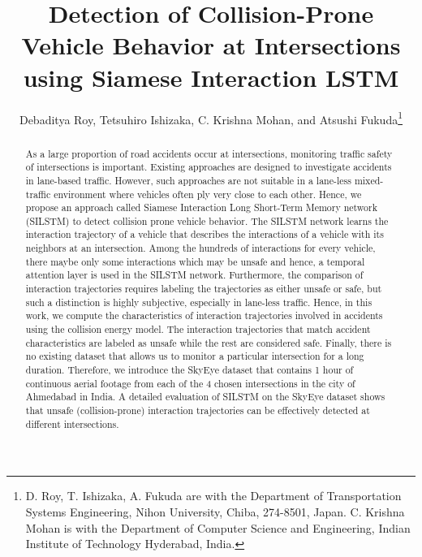 \documentclass[final,journal]{IEEEtran}
\begin{document}
\title{Detection of Collision-Prone Vehicle Behavior at Intersections using Siamese Interaction LSTM}

\author{Debaditya Roy,
        Tetsuhiro Ishizaka, 
        C. Krishna Mohan, and
        Atsushi Fukuda\thanks{D. Roy, T. Ishizaka, A. Fukuda are with the Department of Transportation Systems Engineering, Nihon University, Chiba, 274-8501, Japan. C. Krishna Mohan is with the Department of Computer Science and Engineering, Indian Institute of Technology Hyderabad, India.}}


\maketitle

\begin{abstract}
As a large proportion of road accidents occur at intersections, monitoring traffic safety of intersections is important. Existing approaches are designed to investigate accidents in lane-based traffic. However, such approaches are not suitable in a lane-less mixed-traffic environment where vehicles often ply very close to each other. Hence, we propose an approach called Siamese Interaction Long Short-Term Memory network (SILSTM) to detect collision prone vehicle behavior. The SILSTM network learns the interaction trajectory of a vehicle that describes the interactions of a vehicle with its neighbors at an intersection. Among the hundreds of interactions for every vehicle, there maybe only some interactions which may be unsafe and hence, a temporal attention layer is used in the SILSTM network. Furthermore, the comparison of interaction trajectories requires labeling the trajectories as either unsafe or safe, but such a distinction is highly subjective, especially in lane-less traffic. Hence, in this work, we compute the characteristics of interaction trajectories involved in accidents using the collision energy model. The interaction trajectories that match accident characteristics are labeled as unsafe while the rest are considered safe. Finally, there is no existing dataset that allows us to monitor a particular intersection for a long duration. Therefore, we introduce the SkyEye dataset that contains 1 hour of continuous aerial footage from each of the 4 chosen intersections in the city of Ahmedabad in India. A detailed evaluation of SILSTM on the SkyEye dataset shows that unsafe (collision-prone) interaction trajectories can be effectively detected at different intersections. 
\end{abstract}
\end{document}
